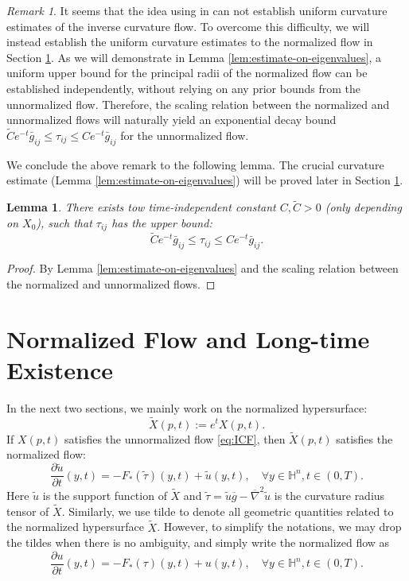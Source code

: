 \documentclass[reqno]{amsart}
\newtheorem{lemma}[theorem]{Lemma}
\theoremstyle{remark}
\newtheorem{remark}[theorem]{Remark}
\renewcommand{\H}{{\mathbb{H}}}
\newcommand{\pd}[2]{\frac{\partial {#1}}{\partial {#2}}}
\newcommand{\bg}{\bar{g}}
\theoremstyle{definition}
\numberwithin{equation}{section}
\begin{document}
\begin{remark}\label{rem:curvature-estimate}
   It seems that the idea using in  \cite{co-compact} can not  establish uniform curvature estimates of the inverse curvature flow. To overcome this difficulty, we will instead establish the uniform curvature estimates to the normalized flow in Section \ref{sec:normalized-flow}. As we will demonstrate in Lemma \ref{lem:estimate-on-eigenvalues}, a uniform upper bound for the principal radii of the normalized flow can be established independently, without relying on any prior bounds from the unnormalized flow. Therefore, the scaling relation between the normalized and unnormalized flows will naturally yield an exponential decay bound $\tilde{C}e^{-t}\bg_{ij} \leq \tau_{ij} \leq C e^{-t}\bg_{ij}$ for the unnormalized flow.
\end{remark}

We conclude the above remark to the following lemma. The crucial curvature estimate (Lemma \ref{lem:estimate-on-eigenvalues}) will be proved later in Section \ref{sec:normalized-flow}.
\begin{lemma}
    There exists tow time-independent constant \(C,\tilde{C} > 0\) (only depending on \(X_0\)), such that \(\tau_{ij}\) has the upper bound:
    \begin{equation}\label{eq:max radii estimate}
       \tilde{C}e^{-t}\bg_{ij}\leq  \tau_{ij} \leq C e^{-t}\bg_{ij}.
    \end{equation}
\end{lemma}
\begin{proof}
    By Lemma \ref{lem:estimate-on-eigenvalues} and the scaling relation between the normalized and unnormalized flows.
\end{proof}



\section{Normalized Flow and Long-time Existence}\label{sec:normalized-flow}
In the next two sections, we mainly work on the normalized hypersurface: 
\begin{equation}
    \tilde{X}(p,t) := e^t X(p,t).
\end{equation}
If \(X(p,t)\) satisfies the unnormalized flow \eqref{eq:ICF}, then \(\tilde{X}(p,t)\) satisfies the normalized flow:  
\[ \pd{\tilde{u}}{t}(y,t) = -F_*(\tilde{\tau})(y,t) + \tilde{u}(y,t), \quad \forall y\in \H^n, t\in (0,T). \]
Here \(\tilde{u}\)  is the support function of \(\tilde{X}\) and $\tilde{\tau}=\tilde{u}\overline{g}-\overline{\nabla}^2\tilde{u}$
is the curvature radius tensor of $\tilde{X}$. Similarly, we use tilde to denote all geometric quantities related to the normalized hypersurface \(\tilde{X}\). However, to simplify the notations, we may drop the tildes when there is no ambiguity, and simply write the normalized flow as 
\begin{equation}\label{eq:normalized-flow} 
    \pd{u}{t}(y,t) = -F_*(\tau)(y,t) + u(y,t), \quad \forall y\in \H^n, t\in (0,T). 
\end{equation}
\end{document}
